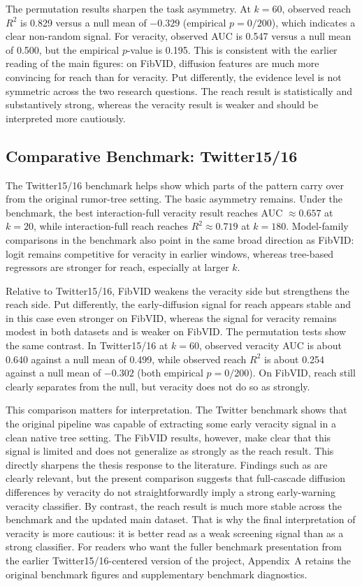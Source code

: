 The permutation results sharpen the task asymmetry. At $k=60$, observed reach $R^2$ is 0.829 versus a null mean of $-0.329$ (empirical $p=0/200$), which indicates a clear non-random signal. For veracity, observed AUC is 0.547 versus a null mean of 0.500, but the empirical $p$-value is 0.195. This is consistent with the earlier reading of the main figures: on FibVID, diffusion features are much more convincing for reach than for veracity. Put differently, the evidence level is not symmetric across the two research questions. The reach result is statistically and substantively strong, whereas the veracity result is weaker and should be interpreted more cautiously.

\subsection{Comparative Benchmark: Twitter15/16}
The Twitter15/16 benchmark helps show which parts of the pattern carry over from the original rumor-tree setting. The basic asymmetry remains. Under the benchmark, the best interaction-full veracity result reaches AUC $\approx 0.657$ at $k=20$, while interaction-full reach reaches $R^2 \approx 0.719$ at $k=180$. Model-family comparisons in the benchmark also point in the same broad direction as FibVID: logit remains competitive for veracity in earlier windows, whereas tree-based regressors are stronger for reach, especially at larger $k$.

Relative to Twitter15/16, FibVID weakens the veracity side but strengthens the reach side. Put differently, the early-diffusion signal for reach appears stable and in this case even stronger on FibVID, whereas the signal for veracity remains modest in both datasets and is weaker on FibVID. The permutation tests show the same contrast. In Twitter15/16 at $k=60$, observed veracity AUC is about 0.640 against a null mean of 0.499, while observed reach $R^2$ is about 0.254 against a null mean of $-0.302$ (both empirical $p=0/200$). On FibVID, reach still clearly separates from the null, but veracity does not do so as strongly.

This comparison matters for interpretation. The Twitter benchmark shows that the original pipeline was capable of extracting some early veracity signal in a clean native tree setting. The FibVID results, however, make clear that this signal is limited and does not generalize as strongly as the reach result. This directly sharpens the thesis response to the literature. Findings such as \citet{vosoughi_spread_2018} are clearly relevant, but the present comparison suggests that full-cascade diffusion differences by veracity do not straightforwardly imply a strong early-warning veracity classifier. By contrast, the reach result is much more stable across the benchmark and the updated main dataset. That is why the final interpretation of veracity is more cautious: it is better read as a weak screening signal than as a strong classifier.
For readers who want the fuller benchmark presentation from the earlier Twitter15/16-centered version of the project, Appendix~A retains the original benchmark figures and supplementary benchmark diagnostics.

